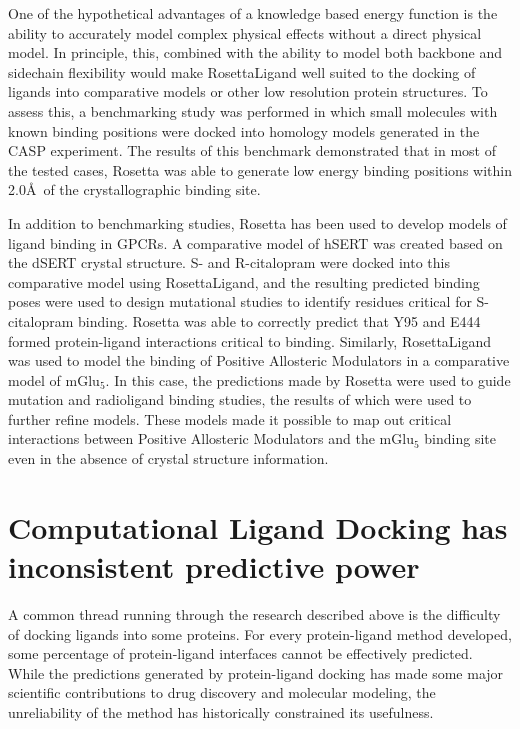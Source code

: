 One of the hypothetical advantages of a knowledge based energy function is the ability to accurately model complex physical effects without a direct physical model.
In principle, this, combined with the ability to model both backbone and sidechain flexibility would make RosettaLigand well suited to the docking of ligands into comparative models or other low resolution protein structures. 
To assess this, a benchmarking study was performed in which small molecules with known binding positions were docked into homology models generated in the CASP experiment\citep{Kaufmann:2012ck}.
The results of this benchmark demonstrated that in most of the tested cases, Rosetta was able to generate low energy binding positions within 2.0\AA\ of the crystallographic binding site.

In addition to benchmarking studies, Rosetta has been used to develop models of ligand binding in GPCRs.
A comparative model of hSERT was created based on the dSERT crystal structure. 
S- and R-citalopram were docked into this comparative model using RosettaLigand, and the resulting predicted binding poses were used to design mutational studies to identify residues critical for S-citalopram binding.
Rosetta was able to correctly predict that Y95 and E444 formed protein-ligand interactions critical to binding\citep{Combs:2011db}.  
Similarly, RosettaLigand was used to model the binding of Positive Allosteric Modulators in a comparative model of mGlu$_{5}$\citep{Turlington:2013et}.
In this case, the predictions made by Rosetta were used to guide mutation and radioligand binding studies, the results of which were used to further refine models.
These models made it possible to map out critical interactions between Positive Allosteric Modulators and the mGlu$_{5}$ binding site even in the absence of crystal structure information.


\section{Computational Ligand Docking has inconsistent predictive power} 

A common thread running through the research described above is the difficulty of docking ligands into some proteins.
For every protein-ligand method developed, some percentage of protein-ligand interfaces cannot be effectively predicted.
While the predictions generated by protein-ligand docking has made some major scientific contributions to drug discovery and molecular modeling, the unreliability of the method has historically constrained its usefulness.

